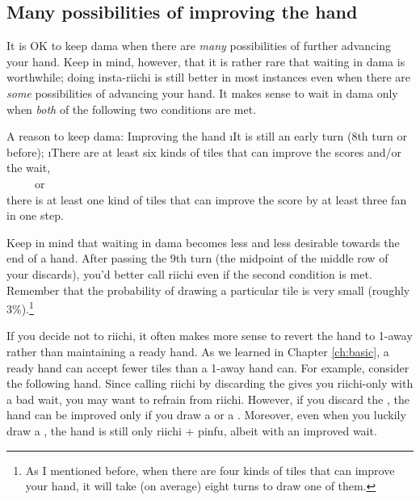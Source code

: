 \newpage
\subsection{Many possibilities of improving the hand} \label{sec:imp}
It is OK to keep {\jap dama} when there are \emph{many} possibilities of further advancing your hand. Keep in mind, however, that it is rather rare that waiting in {\jap dama} is worthwhile; doing insta-{\jap riichi} is still better in most instances even when there are \emph{some} possibilities of advancing your hand. It makes sense to wait in {\jap dama} only when \emph{both} of the following two conditions are met. 

\bigskip
\begin{itembox}[c]{A reason to keep {\jap dama}: Improving the hand}
\bi
\i It is still an early turn (8th turn or before);
\i There are at least six kinds of tiles that can improve the scores and/or the wait, \\~~~~~or\\
there is at least one kind of tiles that can improve the score by at least three {\jap fan} in one step.
\ei
\end{itembox}

\bigskip
Keep in mind that waiting in {\jap dama} becomes less and less desirable towards the end of a hand. After passing the 9th turn (the midpoint of the middle row of your discards), you'd better call {\jap riichi} even if the second condition is met. Remember that the probability of drawing a particular tile is very small (roughly 3\%).\footnote{As I mentioned before, when there are four kinds of tiles that can improve your hand, it will take (on average) eight turns to draw one of them.}

\bigskip
If you decide not to {\jap riichi}, it often makes more sense to revert the hand to 1-away rather than maintaining a ready hand. As we learned in Chapter \ref{ch:basic}, a ready hand can accept fewer tiles than a 1-away hand can. For example, consider the following hand.
\bp
{}%
\ep
Since calling {\jap riichi} by discarding the {\large {}} gives you {\jap riichi}-only with a bad wait, you may want to refrain from {\jap riichi}. However, if you discard the {\large {}}, the hand can be improved only if you draw a {\large {}} or a {\large {}}. Moreover, even when you luckily draw a {\large {}}, the hand is still only {\jap riichi} + {\jap pinfu}, albeit with an improved wait. 

